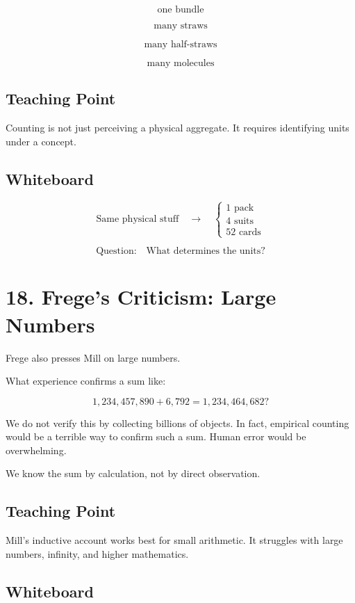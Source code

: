 \documentclass[11pt]{article}
\begin{document}
\[
\text{one bundle}
\]

\[
\text{many straws}
\]

\[
\text{many half-straws}
\]

\[
\text{many molecules}
\]

\subsection*{Teaching Point}

Counting is not just perceiving a physical aggregate. It requires identifying units under a
concept.

\subsection*{Whiteboard}

\[
\text{Same physical stuff}
\quad \rightarrow \quad
\begin{cases}
1 \text{ pack} \\
4 \text{ suits} \\
52 \text{ cards}
\end{cases}
\]

\[
\text{Question:}
\quad
\text{What determines the units?}
\]

\section*{18. Frege's Criticism: Large Numbers}

Frege also presses Mill on large numbers.

What experience confirms a sum like:

\[
1{,}234{,}457{,}890 + 6{,}792 = 1{,}234{,}464{,}682?
\]

We do not verify this by collecting billions of objects. In fact, empirical counting would be
a terrible way to confirm such a sum. Human error would be overwhelming.

We know the sum by calculation, not by direct observation.

\subsection*{Teaching Point}

Mill's inductive account works best for small arithmetic. It struggles with large numbers,
infinity, and higher mathematics.

\subsection*{Whiteboard}
\end{document}
